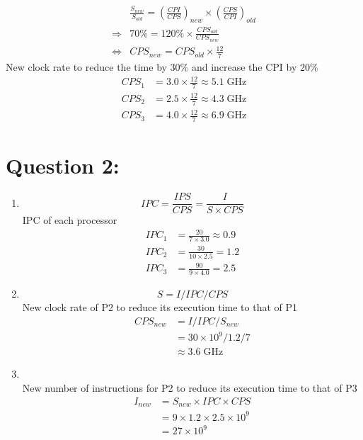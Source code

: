 \documentclass[12pt,a4paper]{article}
\begin{document}
\begin{enumerate}[label=\alph*.]
        \begin{align*}
                          & \frac{S_{new}}{S_{old}} = {(\frac{CPI}{CPS})}_{new} \times {(\frac{CPS}{CPI})}_{old} \\
          \Rightarrow     & 70\% = 120\% \times \frac{CPS_{old}}{CPS_{new}}                                      \\
          \Leftrightarrow & CPS_{new} = CPS_{old} \times \frac{12}{7}
        \end{align*}
        New clock rate to reduce the time by 30\% and increase the CPI by 20\%
        \begin{align*}
          CPS_1 & = 3.0 \times \frac{12}{7} \approx 5.1\;\text{GHz} \\
          CPS_2 & = 2.5 \times \frac{12}{7} \approx 4.3\;\text{GHz} \\
          CPS_3 & = 4.0 \times \frac{12}{7} \approx 6.9\;\text{GHz}
        \end{align*}
\end{enumerate}

\section*{Question 2:}
\begin{enumerate}[label=\alph*.]
  \item%
        \begin{equation*}
          IPC = \frac{IPS}{CPS} = \frac{I}{S \times CPS}
        \end{equation*}
        IPC of each processor
        \begin{align*}
          IPC_1 & = \frac{20}{7 \times 3.0} \approx 0.9 \\
          IPC_2 & = \frac{30}{10 \times 2.5} = 1.2      \\
          IPC_3 & = \frac{90}{9 \times 4.0} = 2.5
        \end{align*}
  \item%
        \begin{equation*}
          S = I / IPC / CPS
        \end{equation*}
        New clock rate of P2 to reduce its execution time to that of P1
        \begin{align*}
          CPS_{new} & = I / IPC / S_{new}        \\
                    & = 30 \times 10^9 / 1.2 / 7 \\
                    & \approx 3.6\;\text{GHz}
        \end{align*}
  \item\mbox{}\\
        New number of instructions for P2 to reduce its execution time to that of P3
        \begin{align*}
          I_{new} & = S_{new} \times IPC \times CPS       \\
                  & = 9 \times 1.2 \times 2.5 \times 10^9 \\
                  & = 27 \times 10^9
        \end{align*}
\end{enumerate}
\end{document}

